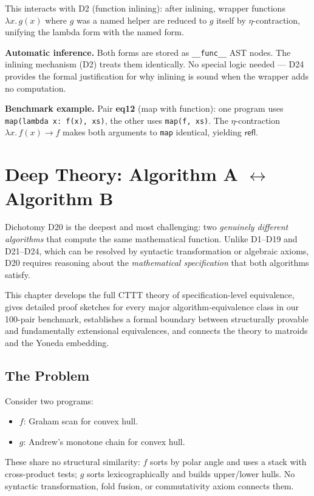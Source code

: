 \documentclass[11pt,a4paper]{report}
\theoremstyle{definition}
\theoremstyle{plain}
\begin{document}
This interacts with D2 (function inlining): after inlining, wrapper
functions $\lambda x.\, g(x)$ where $g$ was a named helper are
reduced to $g$ itself by $\eta$-contraction, unifying the lambda
form with the named form.

\textbf{Automatic inference.}
Both forms are stored as \texttt{\_\_func\_\_} AST nodes.  The
inlining mechanism (D2) treats them identically.  No special logic
needed --- D24 provides the formal justification for why inlining
is sound when the wrapper adds no computation.

\textbf{Benchmark example.}
Pair \textbf{eq12} (map with function): one program uses
\texttt{map(lambda x: f(x), xs)}, the other uses
\texttt{map(f, xs)}.  The $\eta$-contraction
$\lambda x.\, f(x) \to f$ makes both arguments to \texttt{map}
identical, yielding $\mathsf{refl}$.


\chapter{Deep Theory: Algorithm A $\leftrightarrow$ Algorithm B}
\label{ch:algo-deep}

Dichotomy D20 is the deepest and most challenging: two \emph{genuinely
different algorithms} that compute the same mathematical function.
Unlike D1--D19 and D21--D24, which can be resolved by syntactic
transformation or algebraic axioms, D20 requires reasoning about
the \emph{mathematical specification} that both algorithms satisfy.

This chapter develops the full CTTT theory of specification-level
equivalence, gives detailed proof sketches for every major
algorithm-equivalence class in our 100-pair benchmark, establishes
a formal boundary between structurally provable and fundamentally
extensional equivalences, and connects the theory to matroids and
the Yoneda embedding.

\section{The Problem}

Consider two programs:
\begin{itemize}
  \item $f$: Graham scan for convex hull.
  \item $g$: Andrew's monotone chain for convex hull.
\end{itemize}

These share no structural similarity: $f$ sorts by polar angle and
uses a stack with cross-product tests; $g$ sorts lexicographically
and builds upper/lower hulls.  No syntactic transformation, fold
fusion, or commutativity axiom connects them.
\end{document}
